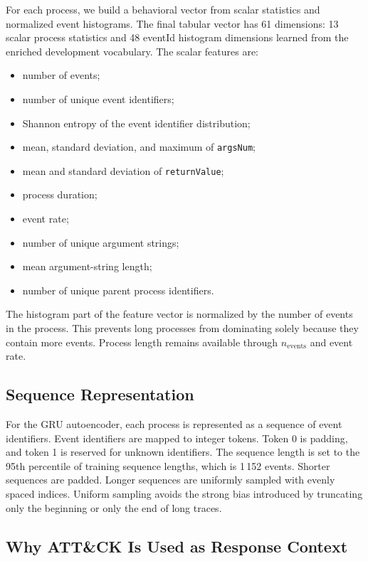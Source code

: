 \documentclass[journal]{IEEEtran}
\begin{document}
For each process, we build a behavioral vector from scalar statistics and normalized event histograms. The final tabular vector has 61 dimensions: 13 scalar process statistics and 48 eventId histogram dimensions learned from the enriched development vocabulary. The scalar features are:
\begin{itemize}
    \item number of events;
    \item number of unique event identifiers;
    \item Shannon entropy of the event identifier distribution;
    \item mean, standard deviation, and maximum of \texttt{argsNum};
    \item mean and standard deviation of \texttt{returnValue};
    \item process duration;
    \item event rate;
    \item number of unique argument strings;
    \item mean argument-string length;
    \item number of unique parent process identifiers.
\end{itemize}

The histogram part of the feature vector is normalized by the number of events in the process. This prevents long processes from dominating solely because they contain more events. Process length remains available through $n_{\text{events}}$ and event rate.

\subsection{Sequence Representation}

For the GRU autoencoder, each process is represented as a sequence of event identifiers. Event identifiers are mapped to integer tokens. Token 0 is padding, and token 1 is reserved for unknown identifiers. The sequence length is set to the 95th percentile of training sequence lengths, which is 1\,152 events. Shorter sequences are padded. Longer sequences are uniformly sampled with evenly spaced indices. Uniform sampling avoids the strong bias introduced by truncating only the beginning or only the end of long traces.

\subsection{Why ATT\&CK Is Used as Response Context}
\end{document}
